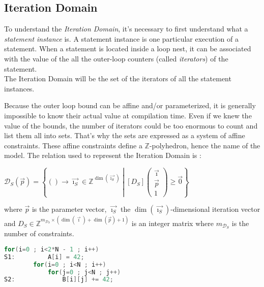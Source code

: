 \documentclass[paper=a4, fontsize=11.5pt]{scrartcl}
\numberwithin{equation}{section}        %
\numberwithin{figure}{section}          %
\numberwithin{table}{section}               %
\begin{document}
    \subsection{Iteration Domain}
        To understand the \textit{Iteration Domain}, it's necessary to first understand
        what a \textit{statement instance} is. A statement instance is one particular
        execution of a statement. When a statement is located inside a loop nest, 
        it can be associated with the value of the all the outer-loop counters
        (called \textit{iterators}) of the statement.\\
        The Iteration Domain will be the set of the iterators of all the statement
        instances.

        Because the outer loop bound can be affine and/or parameterized, it is generally impossible to
        know their actual value at compilation time. Even if we knew the value of the
        bounds, the number of iterators could be too enormous to count and list them all into sets.
        That's why the sets are expressed as a system of affine constraints.
        These affine constraints define a $\mathbb{Z}$-polyhedron, hence the name of the model.
        The relation used to represent the Iteration Domain is :
        \begin{center}
            $ \mathcal{D}_S(\vec{p}) = \left\{() \to \vec{\imath_S} \in \mathbb{Z}^{\dim(\vec{\imath_S})}
            \middle|
            \left[D_S\right]\begin{pmatrix}\vec{\imath} \\ \vec{p} \\ 1\end{pmatrix}
            \geq \vec{0}
            \right\}$
        \end{center}
        where $\vec{p}$ is the parameter vector, $\vec{\imath_S}$ the $\dim(\vec{\imath_S})$-dimensional iteration vector and
        $D_S \in \mathbb{Z}^{m_{\mathcal{D}_S} \times (\dim(\vec{\imath})+\dim(\vec{p})+1)}$
        is an integer matrix where $m_{\mathcal{D}_S}$ is the number of constraints.
        \\

\begin{lstlisting}[frame=single, language=C, caption={Simple Code for Polyhedral Model Example}, label={lst:polyhedral_example}]
        for(i=0 ; i<2*N - 1 ; i++)
S1:         A[i] = 42;
        for(i=0 ; i<N ; i++)
            for(j=0 ; j<N ; j++)
S2:             B[i][j] += 42;
\end{lstlisting}
        
\end{document}
